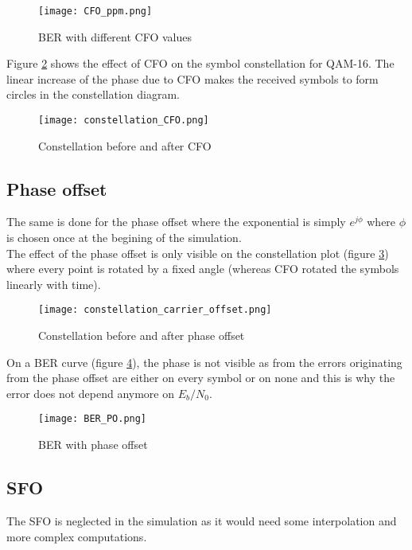 \begin{figure}[H]
    \centering
    \texttt{[image: CFO\_ppm.png]}
    \caption{BER with different CFO values}
    \label{fig:CFO_BER}
\end{figure}

Figure \ref{fig:CFO_const} shows the effect of CFO on the symbol constellation for QAM-16. The linear increase of the phase due to CFO makes the received symbols to form circles in the constellation diagram. \\

\begin{figure}[H]
    \centering
    \texttt{[image: constellation\_CFO.png]}
    \caption{Constellation before and after CFO}
    \label{fig:CFO_const}
\end{figure}

\subsection{Phase offset}
The same is done for the phase offset where the exponential is simply $e^{j\phi}$ where $\phi$ is chosen once at the begining of the simulation. \\

The effect of the phase offset is only visible on the constellation plot (figure \ref{fig:phaseOffsetConst}) where every point is rotated by a fixed angle (whereas CFO rotated the symbols linearly with time). \\

\begin{figure}[H]
    \centering
    \texttt{[image: constellation\_carrier\_offset.png]}
    \caption{Constellation before and after phase offset}
    \label{fig:phaseOffsetConst}
\end{figure}

On a BER curve (figure \ref{fig:BER_PO}), the phase is not visible as from the errors originating from the phase offset are either on every symbol or on none and this is why the error does not depend anymore on $E_b/N_0$. \\

\begin{figure}[H]
    \centering
    \texttt{[image: BER\_PO.png]}
    \caption{BER with phase offset}
    \label{fig:BER_PO}
\end{figure}

\subsection{SFO}
The SFO is neglected in the simulation as it would need some interpolation and more complex computations. \\

